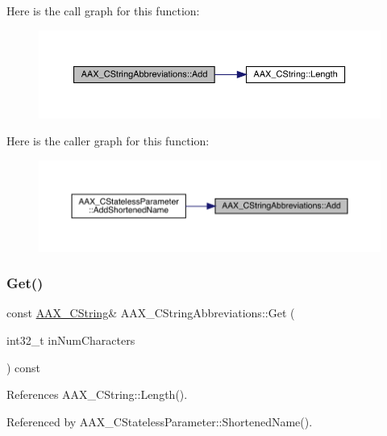 Here is the call graph for this function\+:
\nopagebreak
\begin{figure}[H]
\begin{center}
\leavevmode
\includegraphics[width=350pt]{a01577_a840d1e71735c21a38136812a01693f91_cgraph}
\end{center}
\end{figure}
Here is the caller graph for this function\+:
\nopagebreak
\begin{figure}[H]
\begin{center}
\leavevmode
\includegraphics[width=350pt]{a01577_a840d1e71735c21a38136812a01693f91_icgraph}
\end{center}
\end{figure}
\mbox{\label{a01577_af21dca22bf79b4921f81432ba4e99223}} 
\subsubsection{\texorpdfstring{Get()}{Get()}}
{\footnotesize\ttfamily const \mbox{\hyperlink{a01573}{A\+A\+X\+\_\+\+C\+String}}\& A\+A\+X\+\_\+\+C\+String\+Abbreviations\+::\+Get (\begin{DoxyParamCaption}\item[{int32\+\_\+t}]{in\+Num\+Characters }\end{DoxyParamCaption}) const\hspace{0.3cm}{\ttfamily [inline]}}



References A\+A\+X\+\_\+\+C\+String\+::\+Length().



Referenced by A\+A\+X\+\_\+\+C\+Stateless\+Parameter\+::\+Shortened\+Name().

